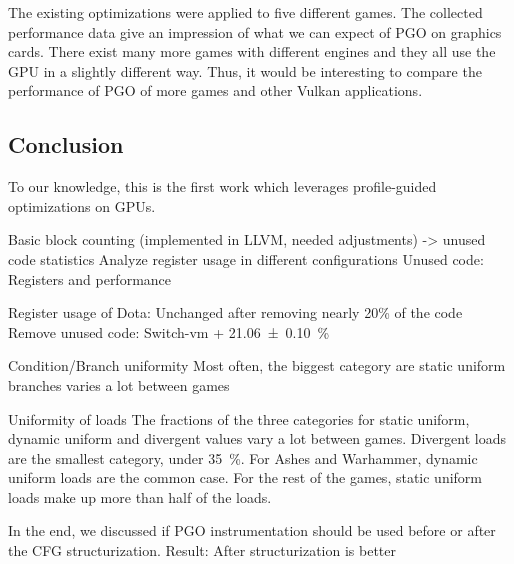 The existing optimizations were applied to five different games.
The collected performance data give an impression of what we can expect of PGO on graphics cards.
There exist many more games with different engines and they all use the GPU in a slightly different way.
Thus, it would be interesting to compare the performance of PGO of more games and other Vulkan applications.

\subsection{Conclusion}
\label{sub:conclusion}
To our knowledge, this is the first work which leverages profile-guided optimizations on GPUs.

Basic block counting (implemented in LLVM, needed adjustments)
-> unused code statistics
Analyze register usage in different configurations
Unused code: Registers and performance

Register usage of Dota: Unchanged after removing nearly 20\% of the code
Remove unused code: Switch-vm + \SI{21.06 \pm 0.10}{\percent}

Condition/Branch uniformity
Most often, the biggest category are static uniform branches
varies a lot between games

Uniformity of loads
The fractions of the three categories for static uniform, dynamic uniform and divergent values vary a lot between games.
Divergent loads are the smallest category, under \SI{35}{\percent}.
For Ashes and Warhammer, dynamic uniform loads are the common case. For the rest of the games, static uniform loads make up more than half of the loads.

In the end, we discussed if PGO instrumentation should be used before or after the CFG structurization.
Result: After structurization is better
